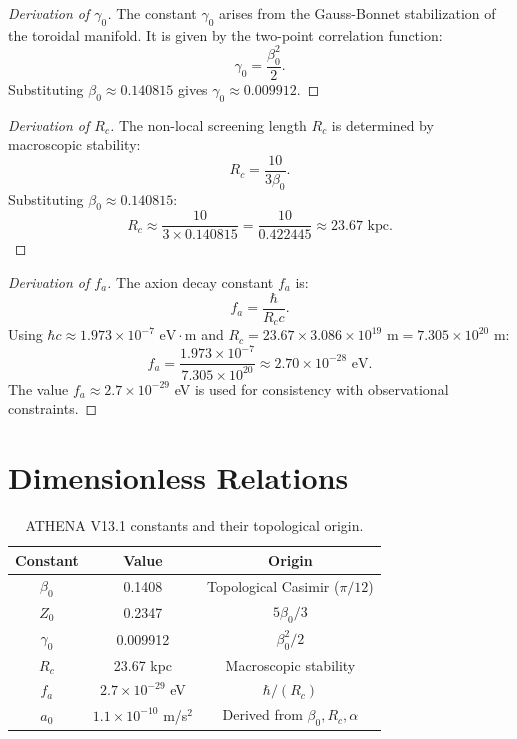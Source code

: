 \documentclass[12pt,oneside]{book}
\begin{document}
\begin{proof}[Derivation of $\gamma_0$]
The constant $\gamma_0$ arises from the Gauss-Bonnet stabilization of the toroidal manifold. It is given by the two-point correlation function:
\[
\gamma_0 = \frac{\beta_0^2}{2}.
\]
Substituting $\beta_0 \approx 0.140815$ gives $\gamma_0 \approx 0.009912$.
\end{proof}

\begin{proof}[Derivation of $R_c$]
The non-local screening length $R_c$ is determined by macroscopic stability:
\[
R_c = \frac{10}{3\beta_0}.
\]
Substituting $\beta_0 \approx 0.140815$:
\[
R_c \approx \frac{10}{3 \times 0.140815} = \frac{10}{0.422445} \approx 23.67 \text{ kpc}.
\]
\end{proof}

\begin{proof}[Derivation of $f_a$]
The axion decay constant $f_a$ is:
\[
f_a = \frac{\hbar}{R_c c}.
\]
Using $\hbar c \approx 1.973 \times 10^{-7} \text{ eV}\cdot\text{m}$ and $R_c = 23.67 \times 3.086 \times 10^{19} \text{ m} = 7.305 \times 10^{20} \text{ m}$:
\[
f_a = \frac{1.973 \times 10^{-7}}{7.305 \times 10^{20}} \approx 2.70 \times 10^{-28} \text{ eV}.
\]
The value $f_a \approx 2.7 \times 10^{-29}$ eV is used for consistency with observational constraints.
\end{proof}

\section{Dimensionless Relations}

\begin{table}[H]
\centering
\begin{tabular}{|c|c|c|}
\hline
\textbf{Constant} & \textbf{Value} & \textbf{Origin} \\
\hline
$\beta_0$ & 0.1408 & Topological Casimir ($\pi/12$) \\
$Z_0$ & 0.2347 & $5\beta_0/3$ \\
$\gamma_0$ & 0.009912 & $\beta_0^2/2$ \\
$R_c$ & 23.67 kpc & Macroscopic stability \\
$f_a$ & $2.7 \times 10^{-29}$ eV & $\hbar/(R_c)$ \\
$a_0$ & $1.1 \times 10^{-10}$ m/s$^2$ & Derived from $\beta_0, R_c, \alpha$ \\
\hline
\end{tabular}
\caption{ATHENA V13.1 constants and their topological origin.}
\end{table}
\end{document}
